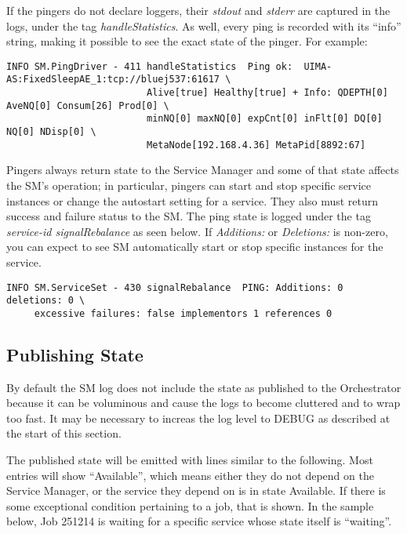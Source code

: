     If the pingers do not declare loggers, their {\em stdout} and {\em stderr} are
    captured in the logs, under the tag {\em handleStatistics}.  As well, every
    ping is recorded with its ``info'' string, making it possible to see the
    exact state of the pinger.  For example:

\begin{verbatim}
INFO SM.PingDriver - 411 handleStatistics  Ping ok:  UIMA-AS:FixedSleepAE_1:tcp://bluej537:61617 \
                         Alive[true] Healthy[true] + Info: QDEPTH[0] AveNQ[0] Consum[26] Prod[0] \
                         minNQ[0] maxNQ[0] expCnt[0] inFlt[0] DQ[0] NQ[0] NDisp[0] \
                         MetaNode[192.168.4.36] MetaPid[8892:67]
\end{verbatim}

    Pingers always return state to the Service Manager and some of that state
    affects the SM's operation; in particular, pingers can start and stop
    specific service instances or change the autostart setting for a
    service.  They also must return success and failure status to the SM.
    The ping state is logged under the tag {\em service-id signalRebalance}
    as seen below.  If {\em Additions:} or {\em Deletions:} is non-zero, you
    can expect to see SM automatically start or stop specific instances for 
    the service.
\begin{verbatim}
INFO SM.ServiceSet - 430 signalRebalance  PING: Additions: 0 deletions: 0 \
     excessive failures: false implementors 1 references 0
\end{verbatim}

\subsection{Publishing State}
    By default the SM log does not include the state as published to the
    Orchestrator because it can be voluminous and cause the logs to 
    become cluttered and to wrap too fast.  It may be necessary to
    increas the log level to DEBUG as described at the start of this section.

   The published state will be emitted with lines similar to the following.  Most
   entries will show ``Available'', which means either they do not depend on
   the Service Manager, or the service they depend on is in state Available.  If there
   is some exceptional condition pertaining to a job, that is shown.  In the
   sample below, Job 251214 is waiting for a specific service whose state itself
   is ``waiting''.

